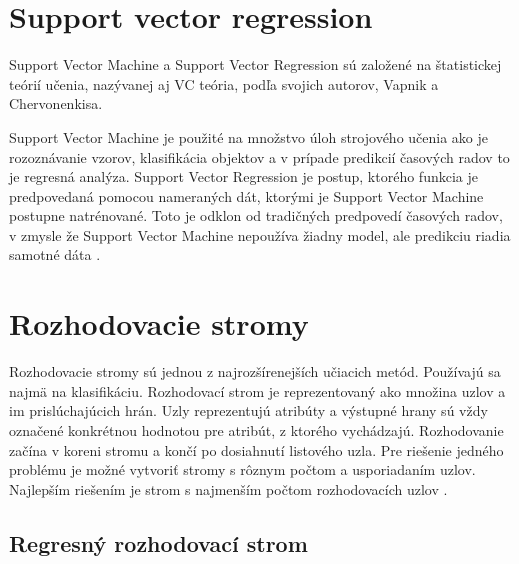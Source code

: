 \documentclass[12pt,oneside,slovak,a4paper]{book}
\begin{document}
\section{Support vector regression}
Support Vector Machine a Support Vector Regression sú založené na štatistickej
teórií učenia, nazývanej aj VC teória, podľa svojich autorov, Vapnik
a Chervonenkisa.

Support Vector Machine je použité na množstvo úloh strojového učenia ako je
rozoznávanie vzorov, klasifikácia objektov a v prípade predikcií časových
radov to je regresná analýza. Support Vector Regression je postup, ktorého
funkcia je predpovedaná pomocou nameraných dát, ktorými je Support Vector
Machine postupne natrénované. Toto je odklon od tradičných predpovedí časových
radov, v zmysle že Support Vector Machine nepoužíva žiadny model, ale
predikciu riadia samotné dáta \cite{Sapankevych2009}.

\section{Rozhodovacie stromy}
Rozhodovacie stromy sú jednou z najrozšírenejších učiacich metód. Používajú sa
najmä na klasifikáciu. Rozhodovací strom je reprezentovaný ako množina uzlov
a im prislúchajúcich hrán. Uzly reprezentujú atribúty a výstupné hrany sú vždy
označené konkrétnou hodnotou pre atribút, z ktorého vychádzajú. Rozhodovanie
začína v koreni stromu a končí po dosiahnutí listového uzla. Pre riešenie
jedného problému je možné vytvoriť stromy s rôznym počtom a usporiadaním uzlov.
Najlepším riešením je strom s najmenším počtom rozhodovacích
uzlov \cite{Merz1998}.

\subsection{Regresný rozhodovací strom}
%


\end{document}
